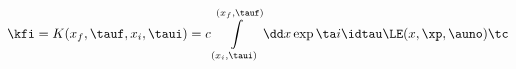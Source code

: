 \begin{equation}
\kfi=K(x_f,\tauf,x_i,\taui)=c\int\limits_{(x_i,\taui)}^{(x_f,\tauf)}
\dd x \exp\ta i\idtau \LE(x,\xp,\auno)\tc
\end{equation}

